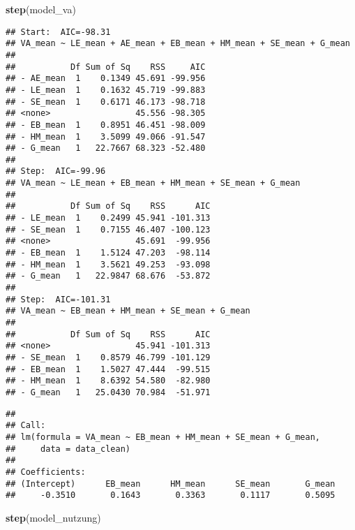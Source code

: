 \documentclass[
]{article}
\newenvironment{Shaded}{\begin{snugshade}}{\end{snugshade}}
\newcommand{\FunctionTok}[1]{\textcolor[rgb]{0.13,0.29,0.53}{\textbf{#1}}}
\newcommand{\NormalTok}[1]{#1}
\begin{document}
\begin{Shaded}
\begin{Highlighting}[]
\FunctionTok{step}\NormalTok{(model\_va)}
\end{Highlighting}
\end{Shaded}

\begin{verbatim}
## Start:  AIC=-98.31
## VA_mean ~ LE_mean + AE_mean + EB_mean + HM_mean + SE_mean + G_mean
## 
##           Df Sum of Sq    RSS     AIC
## - AE_mean  1    0.1349 45.691 -99.956
## - LE_mean  1    0.1632 45.719 -99.883
## - SE_mean  1    0.6171 46.173 -98.718
## <none>                 45.556 -98.305
## - EB_mean  1    0.8951 46.451 -98.009
## - HM_mean  1    3.5099 49.066 -91.547
## - G_mean   1   22.7667 68.323 -52.480
## 
## Step:  AIC=-99.96
## VA_mean ~ LE_mean + EB_mean + HM_mean + SE_mean + G_mean
## 
##           Df Sum of Sq    RSS      AIC
## - LE_mean  1    0.2499 45.941 -101.313
## - SE_mean  1    0.7155 46.407 -100.123
## <none>                 45.691  -99.956
## - EB_mean  1    1.5124 47.203  -98.114
## - HM_mean  1    3.5621 49.253  -93.098
## - G_mean   1   22.9847 68.676  -53.872
## 
## Step:  AIC=-101.31
## VA_mean ~ EB_mean + HM_mean + SE_mean + G_mean
## 
##           Df Sum of Sq    RSS      AIC
## <none>                 45.941 -101.313
## - SE_mean  1    0.8579 46.799 -101.129
## - EB_mean  1    1.5027 47.444  -99.515
## - HM_mean  1    8.6392 54.580  -82.980
## - G_mean   1   25.0430 70.984  -51.971
\end{verbatim}

\begin{verbatim}
## 
## Call:
## lm(formula = VA_mean ~ EB_mean + HM_mean + SE_mean + G_mean, 
##     data = data_clean)
## 
## Coefficients:
## (Intercept)      EB_mean      HM_mean      SE_mean       G_mean  
##     -0.3510       0.1643       0.3363       0.1117       0.5095
\end{verbatim}

\begin{Shaded}
\begin{Highlighting}[]
\FunctionTok{step}\NormalTok{(model\_nutzung)}
\end{Highlighting}
\end{Shaded}
\end{document}
